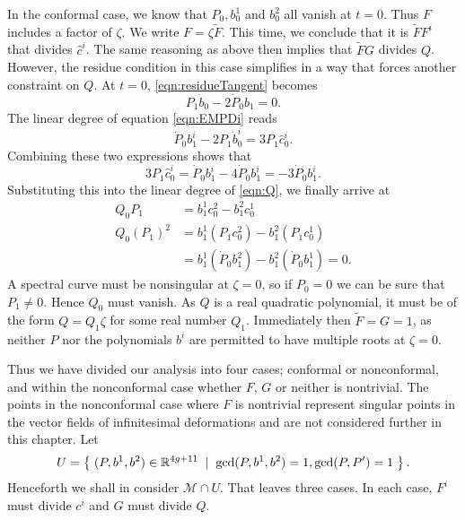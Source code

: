 In the conformal case, we know that $P_0, b^1_0$ and $b^2_0$ all vanish at $t=0$. Thus $F$ includes a factor of $ζ$. We write $F = ζ\tilde{F}$. This time, we conclude that it is $\tilde{F}F^i$ that divides $\hat{c}^i$. The same reasoning as above then implies that $\tilde{F}G$ divides $Q$. However, the residue condition in this case simplifies in a way that forces another constraint on $Q$. At $t=0$, \eqref{eqn:residueTangent} becomes
\[
P_1 \dot{b}_0 - 2 \dot{P}_0 b_1 = 0.
\]
The linear degree of equation \eqref{eqn:EMPDi} reads
\[
\dot P_0 b_1^i - 2P_1\dot b_0^i = 3P_1\hat{c}_0^i.
\]
Combining these two expressions shows that
\[
3P_1\hat{c}_0^i = \dot P_0 b_1^i - 4\dot{P}_0 b_1^i = -3\dot{P}_0 b_1^i.
\]
Substituting this into the linear degree of \eqref{eqn:Q}, we finally arrive at
\begin{align*}
Q_0 P_1 &= b^1_1 c^2_0 - b^2_1 c^1_0 \\
Q_0 (P_1)^2 &= b^1_1 (P_1 c^2_0) - b^2_1 (P_1 c^1_0) \\
&= b^1_1 (\dot{P}_0 b^2_1) - b^2_1 (\dot{P}_0 b^1_1) = 0.
\end{align*}
A spectral curve must be nonsingular at $ζ=0$, so if $P_0=0$ we can be sure that $P_1\neq 0$. Hence $Q_0$ must vanish. As $Q$ is a real quadratic polynomial, it must be of the form $Q=Q_1 ζ$ for some real number $Q_1$. Immediately then $\tilde{F} = G = 1$, as neither $P$ nor the polynomials $b^i$ are permitted to have multiple roots at $ζ=0$.

Thus we have divided our analysis into four cases; conformal or nonconformal, and within the nonconformal case whether $F$, $G$ or neither is nontrivial. The points in the nonconformal case where $F$ is nontrivial represent singular points in the vector fields of infinitesimal deformations and are not considered further in this chapter. Let
\[
U = \left\{\;  (P,b^1,b^2) \in \mathbb{R}^{4g+11}  \;\mid\;  \gcd(P,b^1,b^2) = 1, \gcd(P,P')=1  \;\right\}.
\]
Henceforth we shall in consider $\mathcal{M} \cap U$. That leaves three cases. In each case, $F^i$ must divide $c^i$ and $G$ must divide $Q$.

